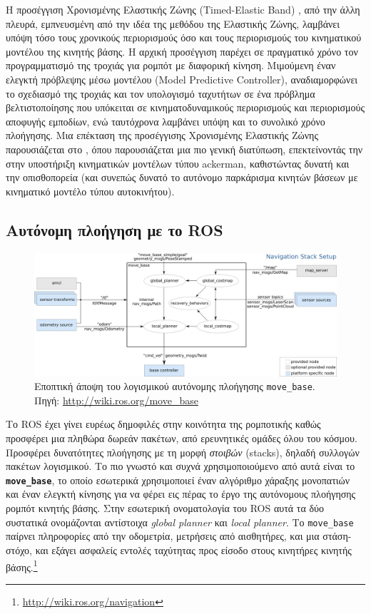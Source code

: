 Η προσέγγιση Χρονισμένης Ελαστικής Ζώνης (Timed-Elastic Band)
\cite{ChristophRoesmann}, από την άλλη πλευρά, εμπνευσμένη από την ιδέα της
μεθόδου της Ελαστικής Ζώνης, λαμβάνει υπόψη τόσο τους χρονικούς περιορισμούς
όσο και τους περιορισμούς του κινηματικού μοντέλου της κινητής βάσης. Η αρχική
προσέγγιση παρέχει σε πραγματικό χρόνο τον προγραμματισμό της τροχιάς για
ρομπότ με διαφορική κίνηση. Μιμούμενη έναν ελεγκτή πρόβλεψης μέσω μοντέλου
(Model Predictive Controller), αναδιαμορφώνει το σχεδιασμό της τροχιάς και τον
υπολογισμό ταχυτήτων σε ένα πρόβλημα βελτιστοποίησης που υπόκειται σε
κινηματοδυναμικούς περιορισμούς και περιορισμούς αποφυγής εμποδίων, ενώ
ταυτόχρονα λαμβάνει υπόψη και το συνολικό χρόνο πλοήγησης. Μια επέκταση της
προσέγγισης Χρονισμένης Ελαστικής Ζώνης παρουσιάζεται στο \cite{Rosmann2017},
όπου παρουσιάζεται μια πιο γενική διατύπωση, επεκτείνοντάς την στην υποστήριξη
κινηματικών μοντέλων τύπου ackerman, καθιστώντας δυνατή και την οπισθοπορεία
(και συνεπώς δυνατό το αυτόνομο παρκάρισμα κινητών βάσεων με κινηματικό μοντέλο
τύπου αυτοκινήτου).



\subsection{Αυτόνομη πλοήγηση με το ROS}
\label{subsection:02_01_02:03}

\begin{figure}\centering
  \includegraphics[width=\textwidth]{./figures/parts/01/chapters/03/sections/01/move_base.png}
  \caption{\small Εποπτική άποψη του λογισμικού αυτόνομης πλοήγησης
           \texttt{move\_base}. Πηγή: \url{http://wiki.ros.org/move\_base}}
  \label{fig:movebase}
\end{figure}

Το ROS έχει γίνει ευρέως δημοφιλές στην κοινότητα της ρομποτικής καθώς
προσφέρει μια πληθώρα δωρεάν πακέτων, από ερευνητικές ομάδες όλου του κόσμου.
Προσφέρει δυνατότητες πλοήγησης με τη μορφή \textit{στοιβών} (stacks), δηλαδή
συλλογών πακέτων λογισμικού. Το πιο γνωστό και συχνά χρησιμοποιούμενο από αυτά
είναι το \texttt{\textbf{move\_base}}, το οποίο εσωτερικά χρησιμοποιεί έναν
αλγόριθμο χάραξης μονοπατιών και έναν ελεγκτή κίνησης για να φέρει εις πέρας
το έργο της αυτόνομους πλοήγησης ρομπότ κινητής βάσης. Στην εσωτερική
ονοματολογία του ROS αυτά τα δύο συστατικά ονομάζονται αντίστοιχα
\textit{global planner} και \textit{local planner}. Το \texttt{move\_base}
παίρνει πληροφορίες από την οδομετρία, μετρήσεις από αισθητήρες, και μια
στάση-στόχο, και εξάγει ασφαλείς εντολές ταχύτητας προς είσοδο στους κινητήρες
κινητής βάσης.\footnote{\url{http://wiki.ros.org/navigation}}

